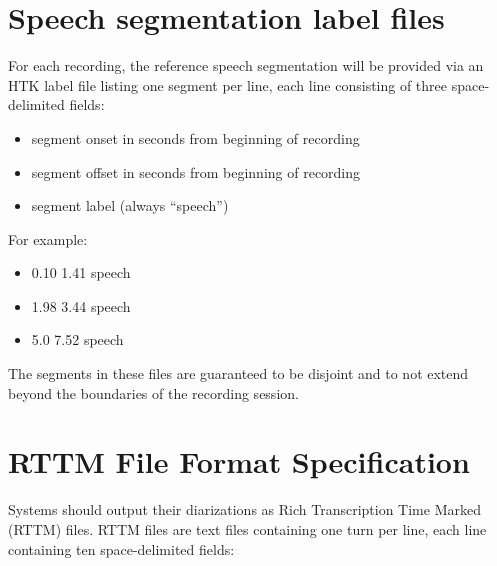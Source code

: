 \documentclass{article}
\begin{document}
\begin{appendices}
\newpage
\section{Speech segmentation label files}
\label{app:sad}
For each recording, the reference speech segmentation will be provided via an HTK label file listing one segment per line, each line consisting of three space-delimited fields:
    \begin{itemize}
        \item segment onset in seconds from beginning of recording
        \item segment offset in seconds from beginning of recording
        \item segment label (always ``speech'')
    \end{itemize}
For example:
    \begin{itemize}
        \item[] 0.10 1.41 speech
        \item[] 1.98 3.44 speech
        \item[] 5.0 7.52 speech
    \end{itemize}
The segments in these files are guaranteed to be disjoint and to not extend beyond the boundaries of the recording session.




\newpage
\section{RTTM File Format Specification}
\label{app:rttm}
Systems should output their diarizations as Rich Transcription Time Marked (RTTM) files. RTTM files are text files containing one turn per line, each line containing ten space-delimited fields:


\end{appendices}
\end{document}

